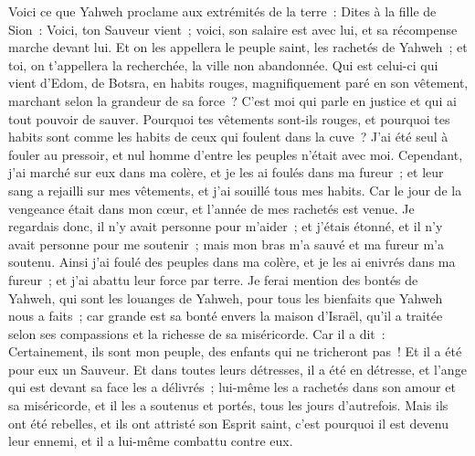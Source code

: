 \begin{multicols}{2}
Voici ce que Yahweh proclame aux extrémités de la terre~: Dites à la fille de Sion~: Voici, ton Sauveur vient~; voici, son salaire est avec lui, et sa récompense marche devant lui.
Et on les appellera le peuple saint, les rachetés de Yahweh~; et toi, on t'appellera la recherchée, la ville non abandonnée.
\VerseOne{}Qui est celui-ci qui vient d'Edom, de Botsra, en habits rouges, magnifiquement paré en son vêtement, marchant selon la grandeur de sa force~? C'est moi qui parle en justice et qui ai tout pouvoir de sauver.
Pourquoi tes vêtements sont-ils rouges, et pourquoi tes habits sont comme les habits de ceux qui foulent dans la cuve~?
J'ai été seul à fouler au pressoir, et nul homme d'entre les peuples n'était avec moi. Cependant, j'ai marché sur eux dans ma colère, et je les ai foulés dans ma fureur~; et leur sang a rejailli sur mes vêtements, et j'ai souillé tous mes habits.
Car le jour de la vengeance était dans mon cœur, et l'année de mes rachetés est venue.
Je regardais donc, il n'y avait personne pour m'aider~; et j'étais étonné, et il n'y avait personne pour me soutenir~; mais mon bras m'a sauvé et ma fureur m'a soutenu.
Ainsi j'ai foulé des peuples dans ma colère, et je les ai enivrés dans ma fureur~; et j'ai abattu leur force par terre.
Je ferai mention des bontés de Yahweh, qui sont les louanges de Yahweh, pour tous les bienfaits que Yahweh nous a faits~; car grande est sa bonté envers la maison d'Israël, qu'il a traitée selon ses compassions et la richesse de sa miséricorde.
Car il a dit~: Certainement, ils sont mon peuple, des enfants qui ne tricheront pas~! Et il a été pour eux un Sauveur.
Et dans toutes leurs détresses, il a été en détresse, et l'ange qui est devant sa face les a délivrés~; lui-même les a rachetés dans son amour et sa miséricorde, et il les a soutenus et portés, tous les jours d'autrefois.
Mais ils ont été rebelles, et ils ont attristé son Esprit saint, c'est pourquoi il est devenu leur ennemi, et il a lui-même combattu contre eux.

\end{multicols}
